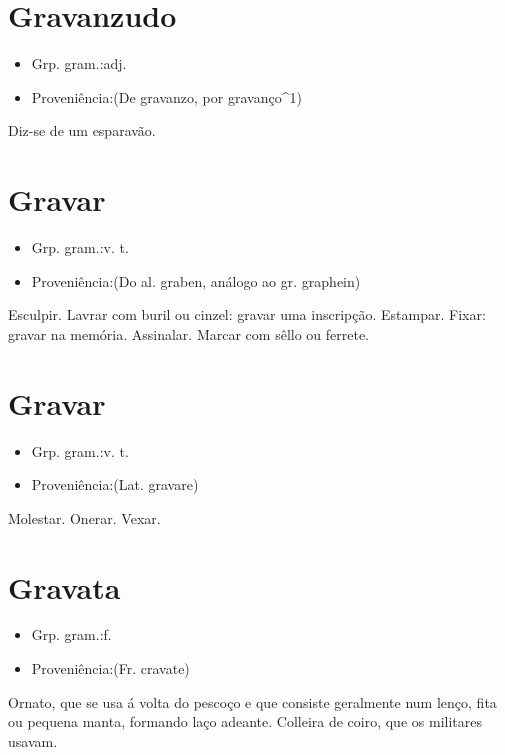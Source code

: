\section{Gravanzudo}
\begin{itemize}
\item {Grp. gram.:adj.}
\end{itemize}
\begin{itemize}
\item {Proveniência:(De \textunderscore gravanzo\textunderscore , por \textunderscore gravanço\textunderscore ^1)}
\end{itemize}
Diz-se de um esparavão.
\section{Gravar}
\begin{itemize}
\item {Grp. gram.:v. t.}
\end{itemize}
\begin{itemize}
\item {Proveniência:(Do al. \textunderscore graben\textunderscore , análogo ao gr. \textunderscore graphein\textunderscore )}
\end{itemize}
Esculpir.
Lavrar com buril ou cinzel: \textunderscore gravar uma inscripção\textunderscore .
Estampar.
Fixar: \textunderscore gravar na memória\textunderscore .
Assinalar.
Marcar com sêllo ou ferrete.
\section{Gravar}
\begin{itemize}
\item {Grp. gram.:v. t.}
\end{itemize}
\begin{itemize}
\item {Proveniência:(Lat. \textunderscore gravare\textunderscore )}
\end{itemize}
Molestar.
Onerar.
Vexar.
\section{Gravata}
\begin{itemize}
\item {Grp. gram.:f.}
\end{itemize}
\begin{itemize}
\item {Proveniência:(Fr. \textunderscore cravate\textunderscore )}
\end{itemize}
Ornato, que se usa á volta do pescoço e que consiste geralmente num lenço, fita ou pequena manta, formando laço adeante.
Colleira de coiro, que os militares usavam.
